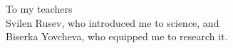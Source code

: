 \thispagestyle{empty}
{}

\vspace*{2cm}

\begin{center}
    To my teachers \\[2pt]
    Svilen Rusev, who introduced me to science, and \\ %
    Biserka Yovcheva, who equipped me to research it.



\end{center}

\medskip
